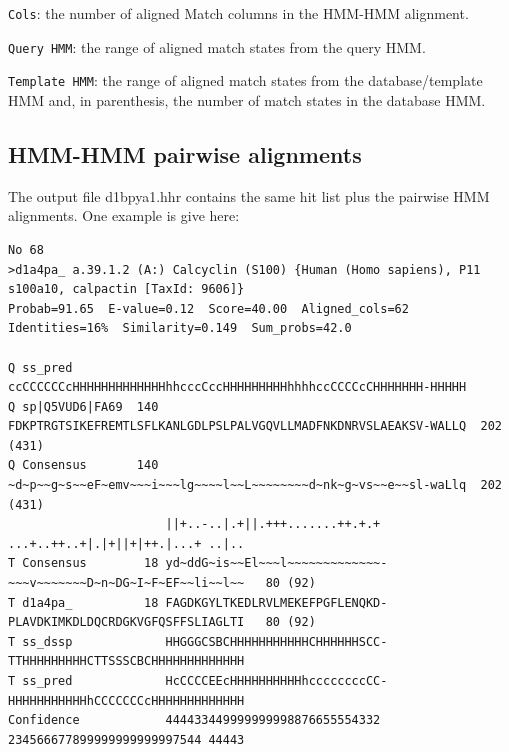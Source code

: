 \documentclass[11pt,a4paper]{article}
\begin{document}
\begin{description}
\item{\verb`Cols`}: the number of aligned Match columns in the HMM-HMM alignment.

\item{\verb`Query HMM`}: the range of aligned match states from the query HMM.

\item{\verb`Template HMM`}: the range of aligned match states from the database/template HMM and, 
in parenthesis, the number of match states in the database HMM.

\end{description}



\subsection{HMM-HMM pairwise alignments}\label{aliblocksformat}

The output file d1bpya1.hhr contains the same hit list plus the pairwise HMM alignments. One example is give here:

\scriptsize
\begin{verbatim}
No 68 
>d1a4pa_ a.39.1.2 (A:) Calcyclin (S100) {Human (Homo sapiens), P11 s100a10, calpactin [TaxId: 9606]}
Probab=91.65  E-value=0.12  Score=40.00  Aligned_cols=62  Identities=16%  Similarity=0.149  Sum_probs=42.0

Q ss_pred             ccCCCCCCcHHHHHHHHHHHHHhhcccCccHHHHHHHHHhhhhccCCCCcCHHHHHHH-HHHHH
Q sp|Q5VUD6|FA69  140 FDKPTRGTSIKEFREMTLSFLKANLGDLPSLPALVGQVLLMADFNKDNRVSLAEAKSV-WALLQ  202 (431)
Q Consensus       140 ~d~p~~g~s~~eF~emv~~~i~~~lg~~~~l~~L~~~~~~~~d~nk~g~vs~~e~~sl-waLlq  202 (431)
                      ||+..-..|.+||.+++.......++.+.+ ...+..++..+|.|+||+|++.|...+ ..|..
T Consensus        18 yd~ddG~is~~El~~~l~~~~~~~~~~~~~-~~~v~~~~~~~D~n~DG~I~F~EF~~li~~l~~   80 (92)
T d1a4pa_          18 FAGDKGYLTKEDLRVLMEKEFPGFLENQKD-PLAVDKIMKDLDQCRDGKVGFQSFFSLIAGLTI   80 (92)
T ss_dssp             HHGGGCSBCHHHHHHHHHHHCHHHHHHSCC-TTHHHHHHHHHCTTSSSCBCHHHHHHHHHHHHH
T ss_pred             HcCCCCEEcHHHHHHHHHHhccccccccCC-HHHHHHHHHHHhCCCCCCCcHHHHHHHHHHHHH
Confidence            444433449999999998876655554332 234566677899999999999997544 44443
\end{verbatim}\normalsize
\end{document}
